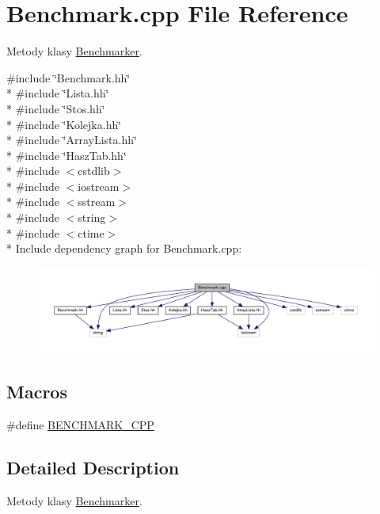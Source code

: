 \hypertarget{a00009}{}\section{Benchmark.\+cpp File Reference}
\label{a00009}


Metody klasy \hyperlink{a00002}{Benchmarker}.  


{\ttfamily \#include \char`\"{}Benchmark.\+hh\char`\"{}}\\*
{\ttfamily \#include \char`\"{}Lista.\+hh\char`\"{}}\\*
{\ttfamily \#include \char`\"{}Stos.\+hh\char`\"{}}\\*
{\ttfamily \#include \char`\"{}Kolejka.\+hh\char`\"{}}\\*
{\ttfamily \#include \char`\"{}Array\+Lista.\+hh\char`\"{}}\\*
{\ttfamily \#include \char`\"{}Hasz\+Tab.\+hh\char`\"{}}\\*
{\ttfamily \#include $<$cstdlib$>$}\\*
{\ttfamily \#include $<$iostream$>$}\\*
{\ttfamily \#include $<$sstream$>$}\\*
{\ttfamily \#include $<$string$>$}\\*
{\ttfamily \#include $<$ctime$>$}\\*
Include dependency graph for Benchmark.\+cpp\+:\nopagebreak
\begin{figure}[H]
\begin{center}
\leavevmode
\includegraphics[width=350pt]{a00025}
\end{center}
\end{figure}
\subsection*{Macros}
\begin{DoxyCompactItemize}
\item 
\#define \hyperlink{a00009_af899221e0ac3b868dd9a8298bd9b1f12}{B\+E\+N\+C\+H\+M\+A\+R\+K\+\_\+\+C\+P\+P}
\end{DoxyCompactItemize}


\subsection{Detailed Description}
Metody klasy \hyperlink{a00002}{Benchmarker}. 

